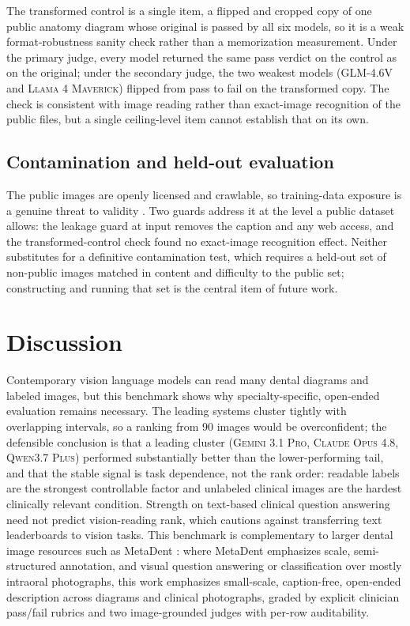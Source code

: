 \documentclass[11pt]{article}
\newcommand{\model}[1]{\textsc{#1}}
\begin{document}
The transformed control is a single item, a flipped and cropped copy of one public anatomy diagram whose original is passed by all six models, so it is a weak format-robustness sanity check rather than a memorization measurement. Under the primary judge, every model returned the same pass verdict on the control as on the original; under the secondary judge, the two weakest models (\model{GLM-4.6V} and \model{Llama 4 Maverick}) flipped from pass to fail on the transformed copy. The check is consistent with image reading rather than exact-image recognition of the public files, but a single ceiling-level item cannot establish that on its own.

\subsection{Contamination and held-out evaluation}

The public images are openly licensed and crawlable, so training-data exposure is a genuine threat to validity \cite{contamination2025survey}. Two guards address it at the level a public dataset allows: the leakage guard at input removes the caption and any web access, and the transformed-control check found no exact-image recognition effect. Neither substitutes for a definitive contamination test, which requires a held-out set of non-public images matched in content and difficulty to the public set; constructing and running that set is the central item of future work.

\section{Discussion}

Contemporary vision language models can read many dental diagrams and labeled images, but this benchmark shows why specialty-specific, open-ended evaluation remains necessary. The leading systems cluster tightly with overlapping intervals, so a ranking from 90 images would be overconfident; the defensible conclusion is that a leading cluster (\model{Gemini 3.1 Pro}, \model{Claude Opus 4.8}, \model{Qwen3.7 Plus}) performed substantially better than the lower-performing tail, and that the stable signal is task dependence, not the rank order: readable labels are the strongest controllable factor and unlabeled clinical images are the hardest clinically relevant condition. Strength on text-based clinical question answering need not predict vision-reading rank, which cautions against transferring text leaderboards to vision tasks. This benchmark is complementary to larger dental image resources such as MetaDent \cite{li2026metadent}: where MetaDent emphasizes scale, semi-structured annotation, and visual question answering or classification over mostly intraoral photographs, this work emphasizes small-scale, caption-free, open-ended description across diagrams and clinical photographs, graded by explicit clinician pass/fail rubrics and two image-grounded judges with per-row auditability.
\end{document}
